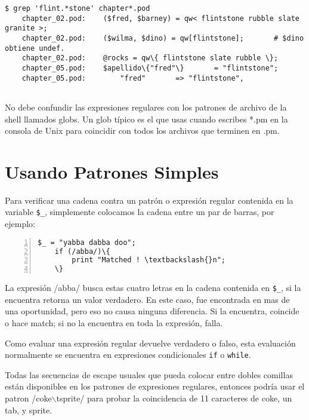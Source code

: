 \vspace{-6pt}
\small
\begin{Verbatim}[commandchars=\\\{\},frame=single,label=Terminal]
    $ grep 'flint.*stone' chapter*.pod
    chapter_02.pod:    ($fred, $barney) = qw< flintstone rubble slate granite >;
    chapter_02.pod:    ($wilma, $dino) = qw[flintstone];       # $dino obtiene undef.
    chapter_02.pod:    @rocks = qw\{ flintstone slate rubble \};
    chapter_05.pod:    $apellido\{"fred"\}       = "flintstone";
    chapter_05.pod:        "fred"       => "flintstone",
    
\end{Verbatim}
\vspace{-6pt}
\normalsize
No debe confundir las expresiones regulares con los patrones de archivo de la shell llamados globs. Un glob típico es el que usas cuando escribes *.pm en la consola de Unix para coincidir con todos los archivos que terminen en .pm.

\section{Usando Patrones Simples}

\label{Usando-Patrones-Simples}

Para verif\mbox{}icar una cadena contra un patrón o expresión regular contenida en la variable \texttt{\$\_}, simplemente colocamos la cadena entre un par de barras, por ejemplo:

\vspace{-6pt}
\small
\begin{Verbatim}[commandchars=\\\{\},numbers=left]
    $_ = "yabba dabba doo";
    if (/abba/)\{
        print "Matched ! \textbackslash{}n";
    \}
\end{Verbatim}
\vspace{-6pt}
\normalsize
La expresión /abba/ busca estas cuatro letras en la cadena contenida en \texttt{\$\_}, si la encuentra retorna un valor verdadero. En este caso, fue encontrada en mas de una oportunidad, pero eso no causa ninguna diferencia. Si la encuentra, coincide o hace match; si no la encuentra en toda la expresión, falla.

Como evaluar una expresión regular devuelve verdadero o falso, esta evaluación normalmente se encuentra en expresiones condicionales \texttt{if} o \texttt{while}.

Todas las secuencias de escape usuales que pueda colocar entre dobles comillas están disponibles en los patrones de expresiones regulares, entonces podría usar el patron /coke$\backslash$tsprite/ para probar la coincidencia de 11 caracteres de coke, un tab, y sprite.

